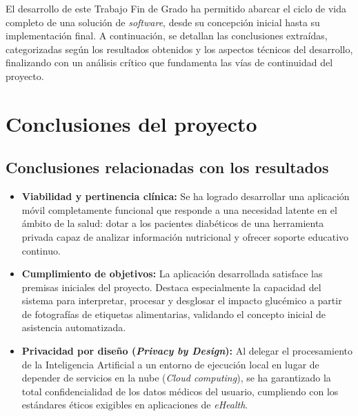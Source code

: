 
El desarrollo de este Trabajo Fin de Grado ha permitido abarcar el ciclo de vida completo de una solución de \textit{software}, desde su concepción inicial hasta su implementación final. A continuación, se detallan las conclusiones extraídas, categorizadas según los resultados obtenidos y los aspectos técnicos del desarrollo, finalizando con un análisis crítico que fundamenta las vías de continuidad del proyecto.

\section{Conclusiones del proyecto}

\subsection{Conclusiones relacionadas con los resultados}
\begin{itemize}
    \item \textbf{Viabilidad y pertinencia clínica:} Se ha logrado desarrollar una aplicación móvil completamente funcional que responde a una necesidad latente en el ámbito de la salud: dotar a los pacientes diabéticos de una herramienta privada capaz de analizar información nutricional y ofrecer soporte educativo continuo.
    \item \textbf{Cumplimiento de objetivos:} La aplicación desarrollada satisface las premisas iniciales del proyecto. Destaca especialmente la capacidad del sistema para interpretar, procesar y desglosar el impacto glucémico a partir de fotografías de etiquetas alimentarias, validando el concepto inicial de asistencia automatizada.
    \item \textbf{Privacidad por diseño (\textit{Privacy by Design}):} Al delegar el procesamiento de la Inteligencia Artificial a un entorno de ejecución local en lugar de depender de servicios en la nube (\textit{Cloud computing}), se ha garantizado la total confidencialidad de los datos médicos del usuario, cumpliendo con los estándares éticos exigibles en aplicaciones de \textit{eHealth}.
\end{itemize}

